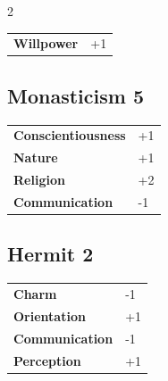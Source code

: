 \begin{multicols}{2}
\begin{tcolorbox}
\begin{tabular}{@{}ll@{}}
    \textbf{Willpower} & +1\\
\end{tabular}


\end{tcolorbox}

\begin{tcolorbox}
    \subsection*{Monasticism \hfill \small{5 }}
    \tcblower




\begin{tabular}{@{}ll@{}}
    \textbf{Conscientiousness} & +1\\
    \textbf{Nature} & +1\\
    \textbf{Religion} & +2\\
    \textbf{Communication} & -1\\
\end{tabular}


\end{tcolorbox}

\begin{tcolorbox}
    \subsection*{Hermit \hfill \small{2 }}
    \tcblower




\begin{tabular}{@{}ll@{}}
    \textbf{Charm} & -1\\
    \textbf{Orientation} & +1\\
    \textbf{Communication} & -1\\
    \textbf{Perception} & +1\\
\end{tabular}



\end{tcolorbox}
\end{multicols}
